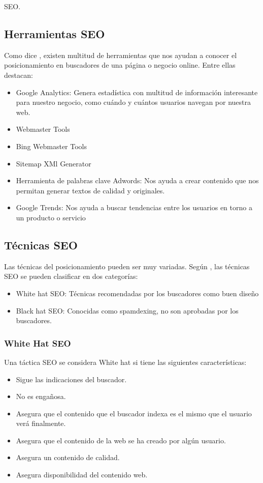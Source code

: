 \begin{section}{SEO.}
		\subsection{Herramientas SEO}
		
		Como dice \cite{seoc}, existen multitud de herramientas que nos ayudan a conocer el posicionamiento en buscadores de una página o negocio online. Entre ellas destacan:
		\begin{itemize}
			\item Google Analytics: Genera estadística con multitud de información interesante para nuestro negocio,  como cuándo y cuántos usuarios navegan por nuestra web.
			\item Webmaster Tools
			\item Bing Webmaster Tools
			\item Sitemap XMl Generator
			\item Herramienta de palabras clave Adwords: Nos ayuda a crear contenido que nos permitan generar textos de calidad y originales.
			\item Google Trends: Nos ayuda a buscar tendencias entre los usuarios en torno a un producto o servicio
		\end{itemize}
		
		\subsection{Técnicas SEO}
		Las técnicas del posicionamiento pueden ser muy variadas. Según \cite{tutorial}, las técnicas SEO se pueden clasificar en dos categorías:
		\begin{itemize}
			\item White hat SEO: Técnicas recomendadas por los buscadores como buen diseño
			\item Black hat SEO: Conocidas como spamdexing, no son aprobadas por los buscadores.
		\end{itemize}
		
		\subsubsection{White Hat SEO}
		Una táctica SEO se considera White hat si tiene las siguientes características:
		\begin{itemize}
			\item Sigue las indicaciones del buscador.
			\item No es engañosa.
			\item Asegura que el contenido que el buscador indexa es el mismo que el usuario verá finalmente.
			\item Asegura que el contenido de la web se ha creado por algún usuario.
			\item Asegura un contenido de calidad.
			\item Asegura disponibilidad del contenido web.
		\end{itemize}
		

\end{section}
